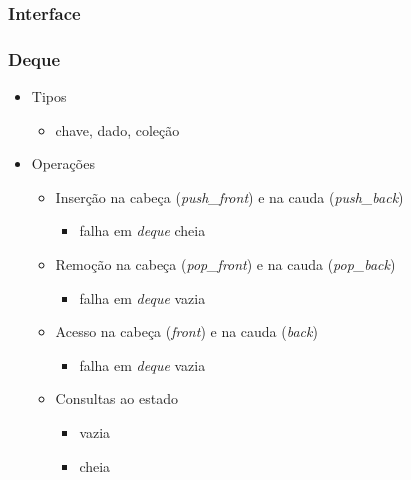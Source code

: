 \documentclass{beamer}
\begin{document}
\begin{frame}
  \frametitle{Interface}
  \frametitle{Deque}

  \begin{itemize}
    \item Tipos
      \begin{itemize}
        \item chave, dado, coleção
      \end{itemize}
    \item Operações
      \begin{itemize}
        \item Inserção na cabeça (\textit{push\_front\/}) e na cauda (\textit{push\_back\/})
          \begin{itemize}
            \item falha em \textit{deque} cheia
          \end{itemize}
        \item Remoção na cabeça (\textit{pop\_front\/}) e na cauda (\textit{pop\_back\/})
          \begin{itemize}
            \item falha em \textit{deque} vazia
          \end{itemize}
        \item Acesso na cabeça (\textit{front\/}) e na cauda (\textit{back\/})
          \begin{itemize}
            \item falha em \textit{deque} vazia
          \end{itemize}
        \item Consultas ao estado
          \begin{itemize}
          \item vazia
          \item cheia
          \end{itemize}
      \end{itemize}
  \end{itemize}
\end{frame}
\end{document}
